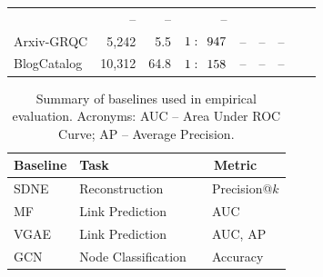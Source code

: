 \documentclass[letterpaper, conference]{IEEEtran}  %
\begin{document}
\begin{table}[ht]
\begin{center}
\begin{adjustbox}{width=0.5\textwidth}
\begin{tabular} {l  r  r  r  r  r  r  r  r}
				 & --
				 & --
				 & -- \\
    Arxiv-GRQC
    		    & 5,242
                & 5.5
                & $1: \hspace{4.5pt} 947$
                & --
                & --
                & -- \\
	BlogCatalog
    		    & 10,312
                & 64.8
                & $1: \hspace{4.5pt} 158$
                & --
                & --
                & -- \\
	\hline
	\end{tabular}
	\label{tab1}
\end{adjustbox}
\end{center}
\end{table}

\begin{table}[ht]
\begin{center}
\caption[Caption for Table 2]{Summary of baselines used in empirical evaluation. Acronyms: AUC -- Area Under ROC Curve; AP -- Average Precision.}
\begin{adjustbox}{width=0.5\textwidth}
	\begin{tabular} {l  l  l}
	\hline
	\multicolumn{1}{l}{\multirow{1}{*}{\textbf{Baseline}}} &
	\multicolumn{1}{l}{\multirow{1}{*}{\textbf{Task}}} &
	\multicolumn{1}{l}{\multirow{1}{*}{\textbf{~~Metric}}} \\ \hline \hline
    SDNE \cite{Wang:2016} ~
							& Reconstruction
							& ~~Precision@$k$ \\
    MF \cite{Menon:2011} ~
					& Link Prediction
					 & ~~AUC \\
    VGAE \cite{VGAE:2016} ~
				& Link Prediction
				 & ~~AUC, AP \\
    GCN \cite{Kipf:2016} ~
						& Node Classification
				 		& ~~Accuracy \\
	\hline
	\end{tabular}
	\label{tab2}
\end{adjustbox}
\end{center}
\end{table}
\end{document}
